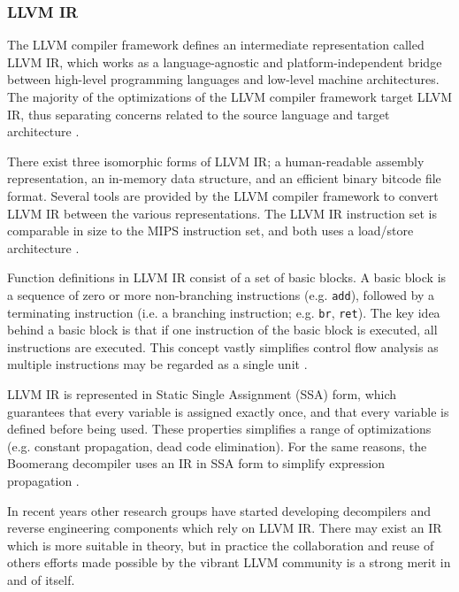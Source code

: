 
\subsubsection{LLVM IR}
\label{sec:lit_review_llvm_ir}

The LLVM compiler framework defines an intermediate representation called LLVM IR, which works as a language-agnostic and platform-independent bridge between high-level programming languages and low-level machine architectures. The majority of the optimizations of the LLVM compiler framework target LLVM IR, thus separating concerns related to the source language and target architecture \cite{llvm_architecture}.

There exist three isomorphic forms of LLVM IR; a human-readable assembly representation, an in-memory data structure, and an efficient binary bitcode file format. Several tools are provided by the LLVM compiler framework to convert LLVM IR between the various representations. The LLVM IR instruction set is comparable in size to the MIPS instruction set, and both uses a load/store architecture \cite{mips_ref,llvm_lang_ref}.

Function definitions in LLVM IR consist of a set of basic blocks. A basic block is a sequence of zero or more non-branching instructions (e.g. \texttt{add}), followed by a terminating instruction (i.e. a branching instruction; e.g. \texttt{br}, \texttt{ret}). The key idea behind a basic block is that if one instruction of the basic block is executed, all instructions are executed. This concept vastly simplifies control flow analysis as multiple instructions may be regarded as a single unit \cite{decomp_of_llvm}.

LLVM IR is represented in Static Single Assignment (SSA) form, which guarantees that every variable is assigned exactly once, and that every variable is defined before being used. These properties simplifies a range of optimizations (e.g. constant propagation, dead code elimination). For the same reasons, the Boomerang decompiler uses an IR in SSA form to simplify expression propagation \cite{ssa_for_decomp}.

In recent years other research groups have started developing decompilers \cite{decomp_of_llvm,retargetable_decomp} and reverse engineering components \cite{mcsema} which rely on LLVM IR. There may exist an IR which is more suitable in theory, but in practice the collaboration and reuse of others efforts made possible by the vibrant LLVM community is a strong merit in and of itself.

